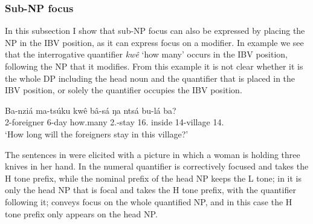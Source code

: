 \documentclass[output=paper,colorlinks,citecolor=brown,
]{langscibook}
\begin{document}
\subsubsection{Sub-NP focus}\label{teke:sec:3.1.3}
In this subsection I show that sub-NP focus can also be expressed by placing the NP in the IBV position, as it can express focus on a modifier. In example  we see that the interrogative quantifier \textit{kwê} `how many' occurs in the IBV position, following the NP that it modifies. From this example it is not clear whether it is the whole DP including the head noun and the quantifier that is placed in the IBV position, or solely the quantifier occupies the IBV position.
\begin{exe}
\ex
\label{43}
\gll
Ba-nziá ma-tsúku kwê bâ-sá ŋa ntsá bu-lá ba?\\
2-foreigner 6-day how.many 2\Sm{}.\Fut{}-stay 16.\Loc{} inside 14-village 14.\Dem{}\\
\trans ‘How long will the foreigners stay in this village?’

\end{exe}
The sentences in  were elicited with a picture in which a woman is holding three knives in her hand. In  the numeral quantifier is correctively focused and takes the H tone prefix, while the nominal prefix of the head NP keeps the L tone; in  it is only the head NP that is focal and takes the H tone prefix, with the quantifier following it;  conveys focus on the whole quantified NP, and in this case the H tone prefix only appears on the head NP.\largerpage[2]
\end{document}

